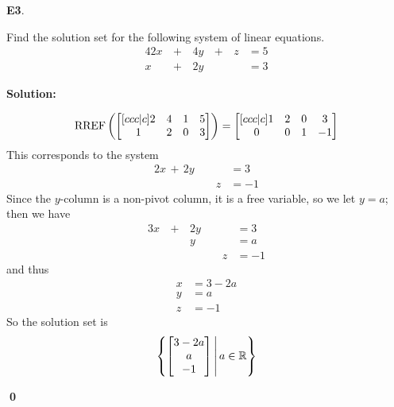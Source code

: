\documentclass{article}
\newenvironment{problem}[1]
{
  \begin{flushleft}
  \textbf{#1}.
  \ignorespaces
}
{
  \end{flushleft}
}
\newenvironment{solution}
{
  \ignorespaces
  \textbf{Solution:}
}
{
  \ignorespacesafterend
  \begin{flushright}
  {\bfseries \qed}
  \end{flushright}
}
\begin{document}
\begin{problem}{E3}
Find the solution set for the following system of linear equations.
\begin{alignat*}{4}
2x&\,+\,&4y&\,+\,&z &= 5 \\
x&\,+\,&2y &\,\,& &= 3
\end{alignat*}
\end{problem}
\begin{solution}
\[
  \operatorname{RREF} \left(
    \begin{bmatrix}[ccc|c] 2 & 4 & 1 & 5 \\ 1 & 2 & 0 & 3 \end{bmatrix}
  \right)
    =
  \begin{bmatrix}[ccc|c] 1 & 2 & 0 & 3 \\ 0 & 0 & 1 & -1\end{bmatrix}
\]
This corresponds to the system
\begin{alignat*}{2}
x\,+\,2y&\,\,&  &= 3 \\
  &\,\,& z&= -1
\end{alignat*}
Since the $y$-column is a non-pivot column, it is a free variable, so we let $y=a$; then we have
\begin{alignat*}{3}
x&\,+\,&2y&\,\,&  &= 3 \\
 &\,\,&y &\,\,& &=a \\
 &\,\,& &\,\,& z&= -1
\end{alignat*}
and thus
\begin{align*}
x&= 3-2a \\
y&= a \\
z&= -1
\end{align*}
So the solution set is
\[
  \left\{
    \begin{bmatrix} 3-2a \\ a \\ -1 \end{bmatrix}
  \,\middle|\,
    a \in \mathbb{R}
  \right\}
\]
\end{solution}
\end{document}
